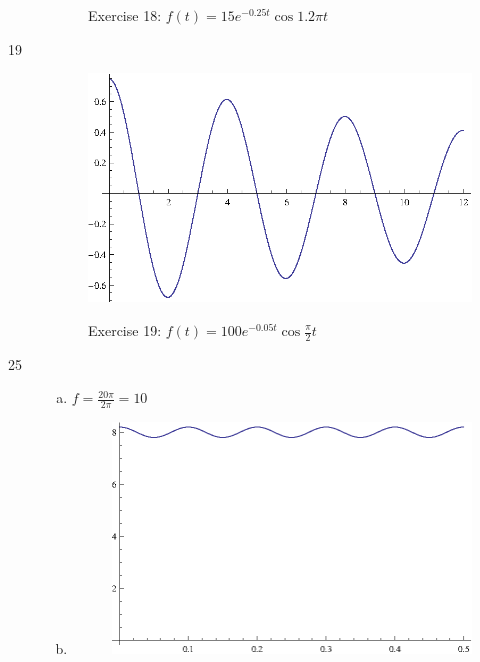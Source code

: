 \documentclass{exam}
\begin{document}
\begin{description}
\begin{figure}[H]
          Exercise 18: $f(t) = 15 e^{-0.25t} \cos 1.2 \pi t$
        \end{figure}

      \item[19]
        \begin{figure}[H]
          \centering
          \includegraphics{exercise19.eps}

          Exercise 19: $f(t) = 100 e^{-0.05t} \cos \frac{\pi}{2} t$
        \end{figure}

      \item[25]
        \pagebreak
        \begin{enumerate}[(a)]
          \item $f = \frac{20 \pi}{2 \pi} = \boxed{ 10 }$

          \item 
            \begin{figure}[H]
              \centering
              \includegraphics{exercise25.eps}


\end{figure}
\end{enumerate}
\end{description}
\end{document}
